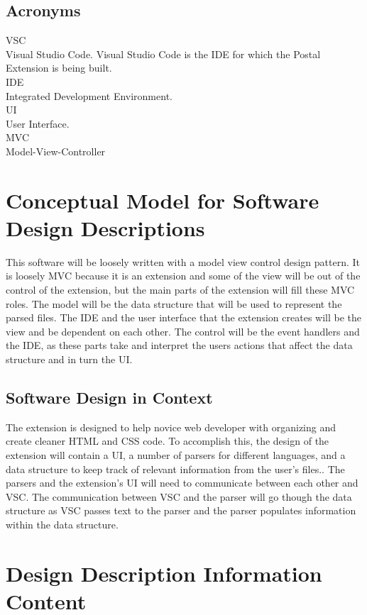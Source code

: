\documentclass[letterpaper,10pt,titlepage,draftclsnofoot,onecolumn,onesided] {IEEEtran}
\begin{document}
\subsection{Acronyms}
VSC \\
Visual Studio Code. Visual Studio Code is the IDE for which the Postal Extension is being built. \\
IDE \\
Integrated Development Environment. \\
UI \\
User Interface. \\
MVC \\
Model-View-Controller


\section{Conceptual Model for Software Design Descriptions}
This software will be loosely written with a model view control design pattern.
It is loosely MVC because it is an extension and some of the view will be out of the control of the extension, but the main parts of the extension will fill these MVC roles.
The model will be the data structure that will be used to represent the parsed files. 
The IDE and the user interface that the extension creates will be the view and be dependent on each other.
The control will be the event handlers and the IDE, as these parts take and interpret the users actions that affect the data structure and in turn the UI.

\subsection{Software Design in Context}
The extension is designed to help novice web developer with organizing and create cleaner HTML and CSS code. 
To accomplish this, the design of the extension will contain a UI, a number of parsers for different languages, and a data structure to keep track of relevant information from the user's files..
The parsers and the extension's UI will need to communicate between each other and VSC.
The communication between VSC and the parser will go though the data structure as VSC passes text to the parser and the parser populates information within the data structure.

\section{Design Description Information Content}
\end{document}
